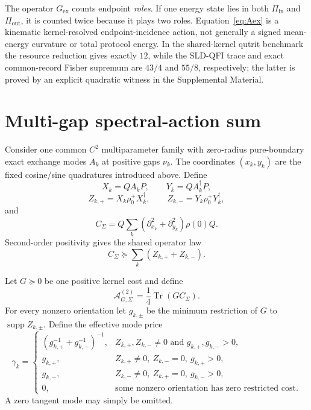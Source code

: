 \documentclass[aps,pra,preprint,nofootinbib]{revtex4-2}
\newcommand{\Tr}{\operatorname{Tr}}
\newcommand{\supp}{\operatorname{supp}}
\newcommand{\rhozero}{\rho_0}
\newcommand{\Aact}{\mathcal A}
\begin{document}
The operator $G_{\mathrm{ex}}$ counts endpoint \emph{roles}. If one energy state lies in both $\Pi_{\mathrm{in}}$ and $\Pi_{\mathrm{out}}$, it is counted twice because it plays two roles. Equation~\eqref{eq:Aex} is a kinematic kernel-resolved endpoint-incidence action, not generally a signed mean-energy curvature or total protocol energy. In the shared-kernel qutrit benchmark the resource reduction gives exactly $12$, while the SLD-QFI trace and exact common-record Fisher supremum are $43/4$ and $55/8$, respectively; the latter is proved by an explicit quadratic witness in the Supplemental Material.

\section{Multi-gap spectral-action sum}
\label{sec:multigap}

Consider one common $C^2$ multiparameter family with zero-radius pure-boundary exact exchange modes $A_k$ at positive gaps $\nu_k$. The coordinates $(x_k,y_k)$ are the fixed cosine/sine quadratures introduced above. Define
\begin{equation}
X_k=QA_kP,\qquad Y_k=QA_k^\dagger P,
\end{equation}
\begin{equation}
Z_{k,+}=X_k\rhozero^+X_k^\dagger,
\qquad
Z_{k,-}=Y_k\rhozero^+Y_k^\dagger,
\end{equation}
and
\begin{equation}
C_\Sigma=
Q\sum_k(\partial_{x_k}^2+\partial_{y_k}^2)\rho(0)Q.
\label{eq:Csigma}
\end{equation}
Second-order positivity gives the shared operator law
\begin{equation}
\boxed{
C_\Sigma\succeq\sum_k(Z_{k,+}+Z_{k,-}).
}
\label{eq:Csigma-bound}
\end{equation}

Let $G\succeq0$ be one positive kernel cost and define
\begin{equation}
\Aact_{G,\Sigma}^{(2)}=\frac14\Tr(GC_\Sigma).
\end{equation}
For every nonzero orientation let $g_{k,\pm}$ be the minimum restriction of $G$ to $\supp Z_{k,\pm}$. Define the effective mode price
\begin{equation}
\gamma_k=
\begin{cases}
(g_{k,+}^{-1}+g_{k,-}^{-1})^{-1},
&Z_{k,+},Z_{k,-}\ne0\text{ and }g_{k,+},g_{k,-}>0,\\[1mm]
g_{k,+},&Z_{k,+}\ne0,\ Z_{k,-}=0,\ g_{k,+}>0,\\[1mm]
g_{k,-},&Z_{k,-}\ne0,\ Z_{k,+}=0,\ g_{k,-}>0,\\[1mm]
0,&\text{some nonzero orientation has zero restricted cost.}
\end{cases}
\label{eq:gammak}
\end{equation}
A zero tangent mode may simply be omitted.
\end{document}

